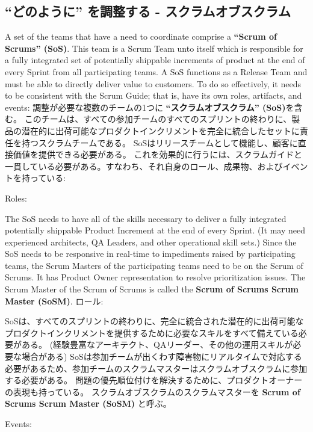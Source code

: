 \documentclass[12pt,a4paper,parskip=full]{scrartcl}
\begin{document}
\subsection{``どのように'' を調整する - スクラムオブスクラム}
A set of the teams that have a need to coordinate comprise a \textbf{``Scrum of Scrums'' (SoS)}. This team is a Scrum Team unto itself which is responsible for a fully integrated set of potentially shippable increments of product at the end of every Sprint from all participating teams. A SoS functions as a Release Team and must be able to directly deliver value to customers. To do so effectively, it needs to be consistent with the Scrum Guide; that is, have its own roles, artifacts, and events:
\fi
調整が必要な複数のチームの1つに \textbf{``スクラムオブスクラム'' (SoS)}を含む。
このチームは、すべての参加チームのすべてのスプリントの終わりに、製品の潜在的に出荷可能なプロダクトインクリメントを完全に統合したセットに責任を持つスクラムチームである。
SoSはリリースチームとして機能し、顧客に直接価値を提供できる必要がある。
これを効果的に行うには、スクラムガイドと一貫している必要がある。すなわち、それ自身のロール、成果物、およびイベントを持っている:

Roles:

The SoS needs to have all of the skills necessary to deliver a fully integrated potentially shippable Product Increment at the end of every Sprint. (It may need experienced architects, QA Leaders, and other operational skill sets.) Since the SoS needs to be responsive in real-time to impediments raised by participating teams, the Scrum Masters of the participating teams need to be on the Scrum of Scrums.
It has Product Owner representation to resolve prioritization issues.
The Scrum Master of the Scrum of Scrums is called the \textbf{Scrum of Scrums Scrum Master (SoSM)}.
\fi
ロール:

SoSは、すべてのスプリントの終わりに、完全に統合された潜在的に出荷可能なプロダクトインクリメントを提供するために必要なスキルをすべて備えている必要がある。
(経験豊富なアーキテクト、QAリーダー、その他の運用スキルが必要な場合がある)
SoSは参加チームが出くわす障害物にリアルタイムで対応する必要があるため、参加チームのスクラムマスターはスクラムオブスクラムに参加する必要がある。
問題の優先順位付けを解決するために、プロダクトオーナーの表現も持っている。
スクラムオブスクラムのスクラムマスターを \textbf{Scrum of Scrums Scrum Master (SoSM)} と呼ぶ。

Events:
\end{document}

